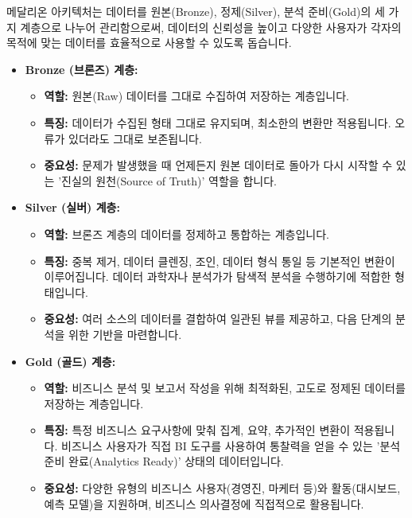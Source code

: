 \documentclass[11pt,a4paper]{article}
\begin{document}
\begin{tcolorbox}[mybox={핵심 요약: 데이터 품질 관리}]
메달리온 아키텍처는 데이터를 원본(Bronze), 정제(Silver), 분석 준비(Gold)의 세 가지 계층으로 나누어 관리함으로써, 데이터의 신뢰성을 높이고 다양한 사용자가 각자의 목적에 맞는 데이터를 효율적으로 사용할 수 있도록 돕습니다.
\end{tcolorbox}

\begin{itemize}
    \item \textbf{Bronze (브론즈) 계층:}
    \begin{itemize}
        \item \textbf{역할:} 원본(Raw) 데이터를 그대로 수집하여 저장하는 계층입니다.
        \item \textbf{특징:} 데이터가 수집된 형태 그대로 유지되며, 최소한의 변환만 적용됩니다. 오류가 있더라도 그대로 보존됩니다.
        \item \textbf{중요성:} 문제가 발생했을 때 언제든지 원본 데이터로 돌아가 다시 시작할 수 있는 '진실의 원천(Source of Truth)' 역할을 합니다.
    \end{itemize}
    \item \textbf{Silver (실버) 계층:}
    \begin{itemize}
        \item \textbf{역할:} 브론즈 계층의 데이터를 정제하고 통합하는 계층입니다.
        \item \textbf{특징:} 중복 제거, 데이터 클렌징, 조인, 데이터 형식 통일 등 기본적인 변환이 이루어집니다. 데이터 과학자나 분석가가 탐색적 분석을 수행하기에 적합한 형태입니다.
        \item \textbf{중요성:} 여러 소스의 데이터를 결합하여 일관된 뷰를 제공하고, 다음 단계의 분석을 위한 기반을 마련합니다.
    \end{itemize}
    \item \textbf{Gold (골드) 계층:}
    \begin{itemize}
        \item \textbf{역할:} 비즈니스 분석 및 보고서 작성을 위해 최적화된, 고도로 정제된 데이터를 저장하는 계층입니다.
        \item \textbf{특징:} 특정 비즈니스 요구사항에 맞춰 집계, 요약, 추가적인 변환이 적용됩니다. 비즈니스 사용자가 직접 BI 도구를 사용하여 통찰력을 얻을 수 있는 '분석 준비 완료(Analytics Ready)' 상태의 데이터입니다.
        \item \textbf{중요성:} 다양한 유형의 비즈니스 사용자(경영진, 마케터 등)와 활동(대시보드, 예측 모델)을 지원하며, 비즈니스 의사결정에 직접적으로 활용됩니다.
    \end{itemize}
\end{itemize}
\end{document}
